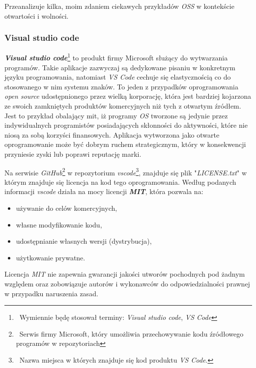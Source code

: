\documentclass{article}
\begin{document}
\hspace{4mm} Przeanalizuje kilka, moim zdaniem ciekawych przykładów \emph{OSS} w kontekście otwartości i wolności.

\subsubsection{Visual studio code}

\hspace{4mm} \textbf{\emph{Visual studio code}}\footnote{\, Wymiennie będę stosował terminy: \emph{Visual studio code}, \emph{VS Code}} to produkt firmy Microsoft służący do wytwarzania programów. Takie aplikacje zazwyczaj są dedykowane pisaniu w konkretnym języku programowania, natomiast \emph{VS Code} cechuje się elastycznością co do stosowanego w nim systemu znaków. To jeden z przypadków oprogramowania \emph{open source} udostępnionego przez wielką korporację, która jest bardziej kojarzona ze swoich zamkniętych produktów komercyjnych niż tych z otwartym źródłem. Jest to przykład obalający mit, iż programy \emph{OS} tworzone są jedynie przez indywidualnych programistów posiadających skłonności do aktywności, które nie niosą za sobą korzyści finansowych. Aplikacja wytworzona jako otwarte oprogramowanie może być dobrym ruchem strategicznym, który w konsekwencji przyniesie zyski lub poprawi reputację marki.

Na serwisie \emph{GitHub}\footnote{\, Serwis firmy Microsoft, który umożliwia przechowywanie kodu źródłowego programów w repozytoriach} w repozytorium \emph{vscode}\footnote{\, Nazwa miejsca w których znajduje się kod produktu \emph{VS Code}.}, znajduje się plik "\emph{LICENSE.txt}" w którym znajduje się licencja na kod tego oprogramowania. Według podanych informacji \emph{vscode} działa na mocy licencji \textbf{\emph{MIT}}, która pozwala na:
\begin{itemize}
    \item używanie do celów komercyjnych,
    \item własne modyfikowanie kodu,
    \item udostępnianie własnych wersji (dystrybucja),
    \item użytkowanie prywatne.
\end{itemize}
Licencja \emph{MIT} nie zapewnia gwarancji jakości utworów pochodnych pod żadnym względem oraz zobowiązuje autorów i wykonawców do odpowiedzialności prawnej w przypadku naruszenia zasad\cite{vscode.mit}.
\end{document}
